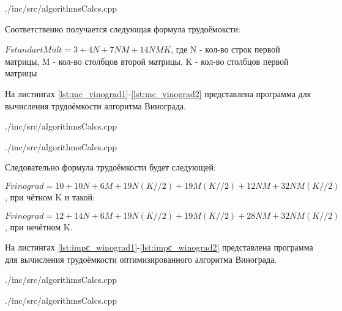 \newpage
\begin{lstinputlisting}[
	caption={Вычисление трудоёмкости классического алгоритма умножения матриц},
	label={lst:mc_std},
	style={c},
	linerange={1-27},
	]{./inc/src/algorithmsCalcs.cpp}
\end{lstinputlisting}

Соответственно получается следующая формула трудоёмоксти:

$FstandartMult = 3+4N+7NM+14NMK$, где N - кол-во строк первой матрицы, M - кол-во столбцов второй матрицы, K - кол-во столбцов первой матрицы

На листингах \ref{lst:mc_vinograd1}-\ref{lst:mc_vinograd2} представлена программа для вычисления трудоёмкости алгоритма Винограда.

\newpage
\begin{lstinputlisting}[
	caption={Вычисление трудоёмкости алгоритма Винограда, часть 1},
	label={lst:mc_vinograd1},
	style={c},
	linerange={29-61},
	]{./inc/src/algorithmsCalcs.cpp}
\end{lstinputlisting}

\newpage
\begin{lstinputlisting}[
	caption={Вычисление трудоёмкости алгоритма Винограда, часть 2},
	label={lst:mc_vinograd1},
	style={c},
	linerange={63-100},
	]{./inc/src/algorithmsCalcs.cpp}
\end{lstinputlisting}

Следовательно формула трудоёмкости будет следующей:

$Fvinograd = 10+10N+6M+19N(K//2)+19M(K//2)+12NM+32NM(K//2)$,  при чётном K
и такой:

$Fvinograd = 12+14N+6M+19N(K//2)+19M(K//2)+28NM+32NM(K//2)$,  при нечётном K.

На листингах \ref{lst:impс_winograd1}-\ref{lst:impс_winograd2} представлена программа для вычисления трудоёмкости оптимизированного алгоритма Винограда.

\begin{lstinputlisting}[
	caption={Вычисление трудоёмкости оптимизированного алгоритма Винограда, часть 1},
	label={lst:impс_winograd1},
	style={c},
	linerange={102-142},
	]{./inc/src/algorithmsCalcs.cpp}
\end{lstinputlisting}

\begin{lstinputlisting}[
	caption={Вычисление трудоёмкости оптимизированного алгоритма Винограда, часть 2},
	label={lst:impс_winograd2},
	style={c},
	linerange={144-172},
	]{./inc/src/algorithmsCalcs.cpp}
\end{lstinputlisting}

